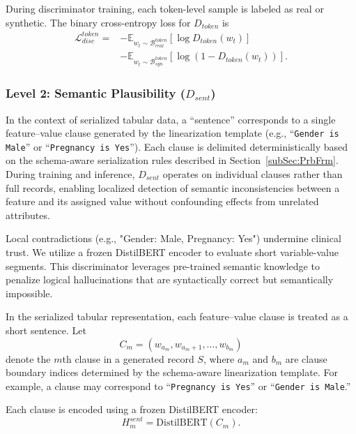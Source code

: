 During discriminator training, each token-level sample is labeled as real or synthetic. The binary cross-entropy loss for $D_{token}$ is
\begin{equation}
\begin{aligned}
\mathcal{L}_{disc}^{token}
= &-
\mathbb{E}_{w_t \sim \mathcal{B}_{real}^{token}}
\left[
\log D_{token}(w_t)
\right] \\
&-
\mathbb{E}_{w_t \sim \mathcal{B}_{syn}^{token}}
\left[
\log(1-D_{token}(w_t))
\right].
\end{aligned}
\end{equation}


\subsubsection{Level 2: Semantic Plausibility ($D_{sent}$)}

In the context of serialized tabular data, a ``sentence'' corresponds to a single feature--value clause generated by the linearization template (e.g., ``\texttt{Gender is Male}'' or ``\texttt{Pregnancy is Yes}''). Each clause is delimited deterministically based on the schema-aware serialization rules described in Section~\ref{subSec:PrbFrm}. During training and inference, $D_{sent}$ operates on individual clauses rather than full records, enabling localized detection of semantic inconsistencies between a feature and its assigned value without confounding effects from unrelated attributes.


Local contradictions (e.g., "Gender: Male, Pregnancy: Yes") undermine clinical trust. We utilize a frozen DistilBERT encoder to evaluate short variable-value segments. This discriminator leverages pre-trained semantic knowledge to penalize logical hallucinations that are syntactically correct but semantically impossible.


In the serialized tabular representation, each feature--value clause is treated as a short sentence. Let
\begin{equation}
C_m = (w_{a_m}, w_{a_m+1}, \ldots, w_{b_m})
\end{equation}
denote the $m$th clause in a generated record $S$, where $a_m$ and $b_m$ are clause boundary indices determined by the schema-aware linearization template. For example, a clause may correspond to ``\texttt{Pregnancy is Yes}'' or ``\texttt{Gender is Male}.''

Each clause is encoded using a frozen DistilBERT encoder:
\begin{equation}
H_m^{sent}
=
\mathrm{DistilBERT}(C_m).
\end{equation}

